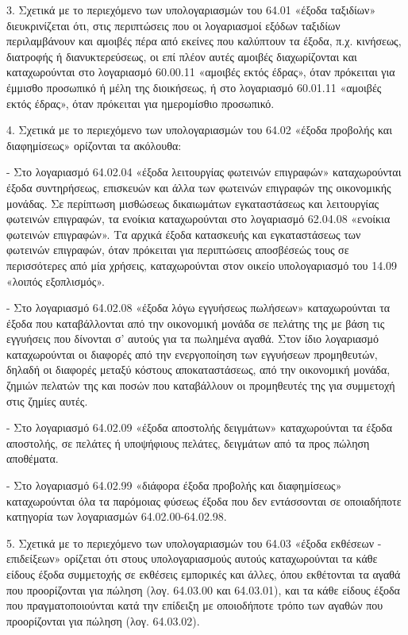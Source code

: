 \documentclass[A4,10pt,greek]{book}
\begin{document}
3. Σχετικά με το περιεχόμενο των υπολογαριασμών του 64.01 «έξοδα ταξιδίων» διευκρινίζεται ότι, στις περιπτώσεις που οι λογαριασμοί εξόδων ταξιδίων περιλαμβάνουν και αμοιβές πέρα από εκείνες που καλύπτουν τα έξοδα, π.χ.  κινήσεως, διατροφής ή διανυκτερεύσεως, οι επί πλέον αυτές αμοιβές διαχωρίζονται και καταχωρούνται στο λογαριασμό 60.00.11 «αμοιβές εκτός έδρας», όταν πρόκειται για έμμισθο προσωπικό ή μέλη της διοικήσεως, ή στο λογαριασμό 60.01.11 «αμοιβές εκτός έδρας», όταν πρόκειται για ημερομίσθιο προσωπικό.

4. Σχετικά με το περιεχόμενο των υπολογαριασμών του 64.02 «έξοδα προβολής και διαφημίσεως» ορίζονται τα ακόλουθα:

- Στο λογαριασμό 64.02.04 «έξοδα λειτουργίας φωτεινών επιγραφών» καταχωρούνται έξοδα συντηρήσεως, επισκευών και άλλα των φωτεινών επιγραφών της οικονομικής μονάδας. Σε περίπτωση μισθώσεως δικαιωμάτων εγκαταστάσεως και λειτουργίας φωτεινών επιγραφών, τα ενοίκια καταχωρούνται στο λογαριασμό 62.04.08 «ενοίκια φωτεινών επιγραφών». Τα αρχικά έξοδα κατασκευής και εγκαταστάσεως των φωτεινών επιγραφών, όταν πρόκειται για περιπτώσεις αποσβέσεώς τους σε περισσότερες από μία χρήσεις, καταχωρούνται στον οικείο υπολογαριασμό του 14.09 «λοιπός εξοπλισμός».

- Στο λογαριασμό 64.02.08 «έξοδα λόγω εγγυήσεως πωλήσεων» καταχωρούνται τα έξοδα που καταβάλλονται από την οικονομική μονάδα σε πελάτης της με βάση τις εγγυήσεις που δίνονται σ' αυτούς για τα πωλημένα αγαθά. Στον ίδιο λογαριασμό καταχωρούνται οι διαφορές από την ενεργοποίηση των εγγυήσεων προμηθευτών, δηλαδή οι διαφορές μεταξύ κόστους αποκαταστάσεως, από την οικονομική μονάδα, ζημιών πελατών της και ποσών που καταβάλλουν οι προμηθευτές της για συμμετοχή στις ζημίες αυτές.

- Στο λογαριασμό 64.02.09 «έξοδα αποστολής δειγμάτων» καταχωρούνται τα έξοδα αποστολής, σε πελάτες ή υποψήφιους πελάτες, δειγμάτων από τα προς πώληση αποθέματα.

- Στο λογαριασμό 64.02.99 «διάφορα έξοδα προβολής και διαφημίσεως» καταχωρούνται όλα τα παρόμοιας φύσεως έξοδα που δεν εντάσσονται σε οποιαδήποτε κατηγορία των λογαριασμών 64.02.00-64.02.98.

5. Σχετικά με το περιεχόμενο των υπολογαριασμών του 64.03 «έξοδα εκθέσεων - επιδείξεων» ορίζεται ότι στους υπολογαριασμούς αυτούς καταχωρούνται τα κάθε είδους έξοδα συμμετοχής σε εκθέσεις εμπορικές και άλλες, όπου εκθέτονται τα αγαθά που προορίζονται για πώληση (λογ. 64.03.00 και 64.03.01), και τα κάθε είδους έξοδα που πραγματοποιούνται κατά την επίδειξη με οποιοδήποτε τρόπο των αγαθών που προορίζονται για πώληση (λογ. 64.03.02).
\end{document}
